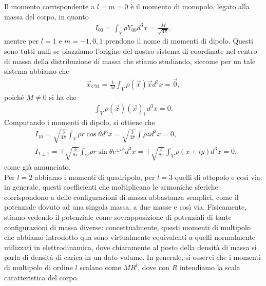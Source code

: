 Il momento corrispondente a $l=m=0$ è il momento di monopolo, legato alla massa del corpo, in quanto
\begin{align}
	I_{00} = \int_V \rho Y_{00} d^3 x = \frac{M}{\sqrt{4\pi}},
\end{align}
mentre per $l=1$ e $m=-1, 0, 1$ prendono il nome di momenti di dipolo. Questi sono tutti nulli se piazziamo l'origine del nostro sistema di coordinate nel centro di massa della distribuzione di massa che stiamo studiando, siccome per un tale sistema abbiamo che
\begin{align}
	\vec{x}_{\text{CM}} = \frac{1}{M} \int_V \rho(\vec{x}) \vec{x} d^3 x = \vec{0},
\end{align}
poiché $M \neq 0$ si ha che
\begin{align}
	\int_V \rho(\vec{x}) (\vec{x})_i \, d^3 x = 0.
\end{align}
Computando i momenti di dipolo, si ottiene che
\begin{align}
	&I_{10} = \sqrt{\frac{3}{4\pi}} \int_V \rho r \cos{\theta} d^3 x = \sqrt{\frac{3}{4 \pi}} \int \rho z d^3 x = 0, \\
	&I_{1 \pm 1}  = \mp \sqrt{\frac{3}{8 \pi}} \int_V \rho r \sin{\theta} e^{\pm i \phi} d^3 x= \mp \sqrt{\frac{3}{8\pi}} \int_V \rho(x \pm iy) d^3 x = 0,
\end{align}
come già annunciato. \\
Per $l=2$ abbiamo i momenti di quadripolo, per $l=3$ quelli di ottopolo e così via: in generale, questi coefficienti che moltiplicano le armoniche sferiche corrispondono a delle configurazioni di massa abbastanza semplici, come il potenziale dovuto ad una singola massa, a due masse e così via. Fisicamente, stiamo vedendo il potenziale come sovrapposizione di potenziali di tante configurazioni di massa diverse: concettualmente, questi momenti di multipolo che abbiamo introdotto qua sono virtualmente equivalenti a quelli normalmente utilizzati in elettrodinamica, dove chiaramente al posto della densità di massa si parla di densità di carica in un dato volume. 
In generale, si osservi che i momenti di multipolo di ordine $l$ scalano come $MR^l$, dove con $R$ intendiamo la scala caratteristica del corpo.


